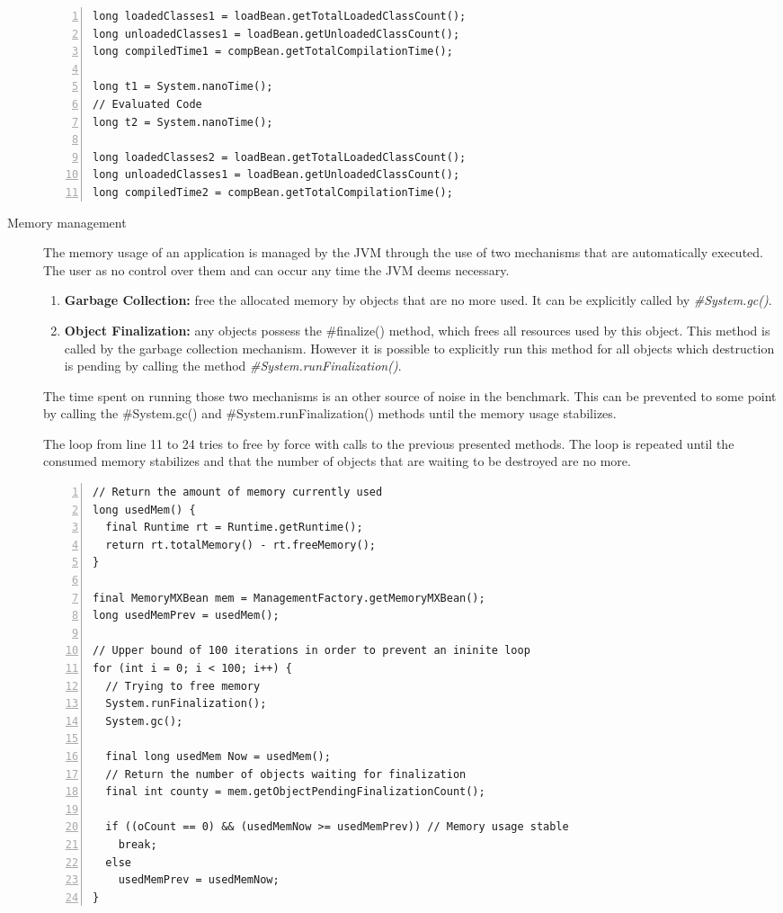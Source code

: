 \begin{description}
\begin{lstlisting}[frame=single,numbers=left]
long loadedClasses1 = loadBean.getTotalLoadedClassCount();
long unloadedClasses1 = loadBean.getUnloadedClassCount();
long compiledTime1 = compBean.getTotalCompilationTime();

long t1 = System.nanoTime();
// Evaluated Code
long t2 = System.nanoTime();

long loadedClasses2 = loadBean.getTotalLoadedClassCount();
long unloadedClasses1 = loadBean.getUnloadedClassCount();
long compiledTime2 = compBean.getTotalCompilationTime();
\end{lstlisting}
\item[Memory management] The memory usage of an application is managed by the
JVM through the use of two mechanisms that are automatically executed. The user
as no control over them and can occur any time the JVM deems necessary.
\begin{enumerate}
  \item {\bfseries Garbage Collection:} free the allocated memory by objects
  that are no more used. It can be explicitly called by \emph{\#System.gc()}.
  \item {\bfseries Object Finalization:} any objects possess the
  \#finalize() method, which frees all resources used by this object. This
  method is called by the garbage collection mechanism. However it is possible
  to explicitly run this method for all objects which destruction is pending by
  calling the method \emph{\#System.runFinalization()}.
\end{enumerate}
The time spent on running those two mechanisms is an other source of noise in
the benchmark. This can be prevented to some point by calling the \#System.gc()
and \#System.runFinalization() methods until the memory usage stabilizes.

The loop from line 11 to 24 tries to free by force with calls to the previous
presented methods. The loop is repeated until the consumed memory stabilizes
and that the number of objects that are waiting to be destroyed are no more.

\begin{lstlisting}[frame=single,numbers=left]
// Return the amount of memory currently used
long usedMem() {
  final Runtime rt = Runtime.getRuntime();
  return rt.totalMemory() - rt.freeMemory();
}
   
final MemoryMXBean mem = ManagementFactory.getMemoryMXBean();
long usedMemPrev = usedMem();

// Upper bound of 100 iterations in order to prevent an ininite loop
for (int i = 0; i < 100; i++) {
  // Trying to free memory 
  System.runFinalization();
  System.gc();

  final long usedMem Now = usedMem();
  // Return the number of objects waiting for finalization
  final int county = mem.getObjectPendingFinalizationCount();

  if ((oCount == 0) && (usedMemNow >= usedMemPrev)) // Memory usage stable
    break;
  else
    usedMemPrev = usedMemNow;
}
\end{lstlisting}
\end{description}

